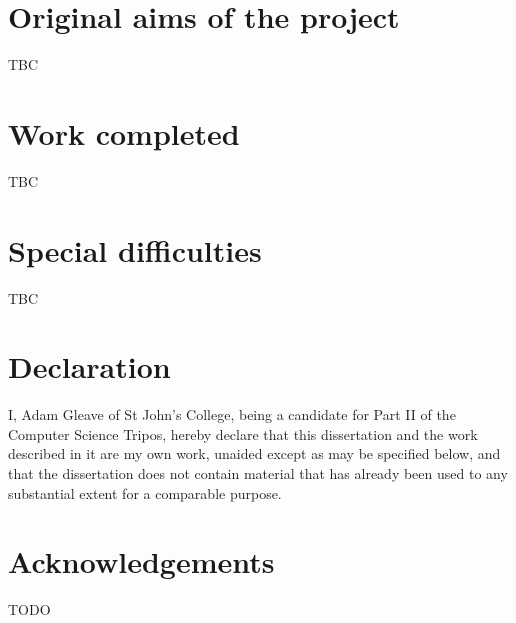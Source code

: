 \documentclass[12pt,a4paper,twoside,notitlepage]{report}
\theoremstyle{plain}
\theoremstyle{definition}
\theoremstyle{remark}
\begin{document}
\renewcommand{\arraystretch}{1.3}
\vspace*{-1em}
\section*{Original aims of the project}

TBC

\vspace*{-1em}
\section*{Work completed}

TBC

\vspace*{-1em}
\section*{Special difficulties}

TBC

\newpage

\section*{Declaration}

I, Adam Gleave of St John's College, being a candidate for Part II of the 
Computer Science Tripos, hereby declare that this dissertation and the work 
described in it are my own work, unaided except as may be specified below, and
that the dissertation does not contain material that has already been used to
any substantial extent for a comparable purpose.

\bigskip
{}
\medskip

\clearpage

\tableofcontents

\listofalgorithms
\listoffigures
\listoftables

\newpage
\section*{Acknowledgements}

TODO

\clearpage	%
\end{document}
